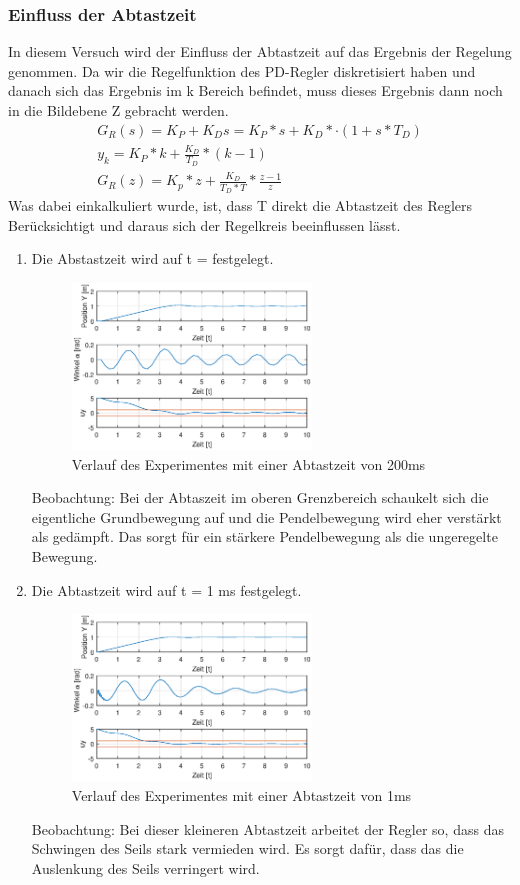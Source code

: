 \documentclass[10pt]{scrartcl}
\begin{document}
\subsubsection{Einfluss der Abtastzeit}

In diesem Versuch wird der Einfluss der Abtastzeit auf das Ergebnis der Regelung genommen. Da wir die Regelfunktion des PD-Regler diskretisiert haben und danach sich das Ergebnis im k Bereich befindet, muss dieses Ergebnis dann noch in die Bildebene Z gebracht werden. 
\begin{align}
   G_R(s) = K_P + K_D s = K_P *s + K_D *·(1 + s *T_D)  \\
   y_k= K_P * k+ \frac{K_D}{T_D} *( k - 1 )  \\
   G_R(z) = K_p * z + \frac{K_D}{T_D*T} *\frac{z-1}{z}
\end{align}
Was dabei einkalkuliert wurde, ist, dass T direkt die Abtastzeit des Reglers Berücksichtigt und daraus sich der Regelkreis beeinflussen lässt.
\begin{enumerate}
\item Die Abstastzeit wird auf t = festgelegt.
\begin{figure}[H]
	\centering
	\includegraphics[width=0.6\textwidth]{Figure45a200mT}
	\caption{Verlauf des Experimentes mit einer Abtastzeit von 200ms}
	\label{img:grafik-dummy}
\end{figure}
Beobachtung:
Bei der Abtaszeit im oberen Grenzbereich schaukelt sich die eigentliche Grundbewegung auf und die Pendelbewegung wird eher verstärkt als gedämpft. Das sorgt für ein stärkere Pendelbewegung als die ungeregelte Bewegung. 
\item Die Abtastzeit wird auf t = 1 ms festgelegt.
\begin{figure}[H]
	\centering
	\includegraphics[width=0.6\textwidth]{45a1mT}
	\caption{Verlauf des Experimentes mit einer Abtastzeit von 1ms}
	\label{img:grafik-dummy}
\end{figure}
Beobachtung: 
Bei dieser kleineren Abtastzeit arbeitet der Regler so, dass das Schwingen des Seils stark vermieden wird. Es sorgt dafür, dass das die Auslenkung des Seils verringert wird.
\end{enumerate}
\end{document}
